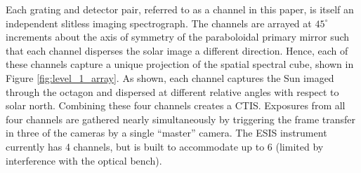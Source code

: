     	Each grating and detector pair, referred to as a channel in this paper,
    	is itself an independent slitless imaging spectrograph.  
    	The channels are arrayed at $45^{\circ}$ increments about the axis of symmetry of the paraboloidal primary mirror such that each channel disperses the solar image a different direction. 
    	Hence, each of these channels capture a unique projection of the spatial spectral cube, shown in Figure \ref{fig:level_1_array}. 
    	As shown, each channel captures the Sun imaged through the octagon and dispersed at different relative angles with respect to solar north. Combining these four channels creates a CTIS. 
    	Exposures from all four channels are gathered nearly simultaneously by triggering the frame transfer in three of the cameras by a single ``master'' camera. 
    	The ESIS instrument currently has 4 channels, but is built to accommodate up to 6 (limited by interference with the optical bench).

    	
	
    

